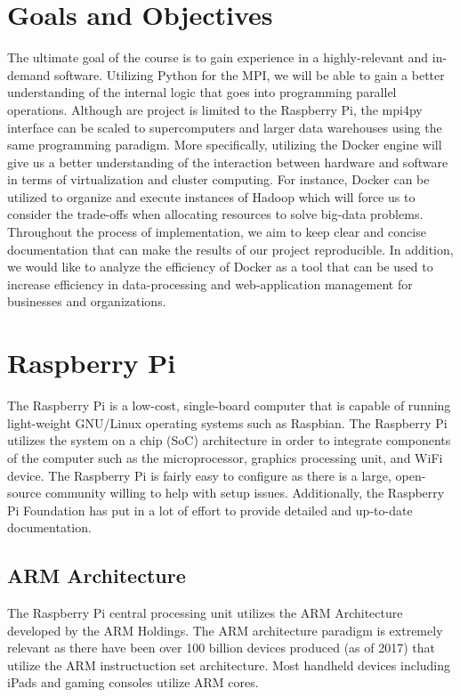 \section{Goals and Objectives}
The ultimate goal of the course is to gain experience in a highly-relevant and in-demand software. Utilizing Python for the MPI, we will be able to gain a better understanding of the internal logic that goes into programming parallel operations. Although are project is limited to the Raspberry Pi, the mpi4py interface can be scaled to supercomputers and larger data warehouses using the same programming paradigm. More specifically, utilizing the Docker engine will give us a better understanding of the interaction between hardware and software in terms of virtualization and cluster computing. For instance, Docker can be utilized to organize and execute instances of Hadoop which will force us to consider the trade-offs when allocating resources to solve big-data problems.  Throughout the process of implementation, we aim to keep clear and concise documentation that can make the results of our project reproducible. In addition, we would like to analyze the efficiency of Docker as a tool that can be used to increase efficiency in data-processing and web-application management for businesses and organizations. 

	


\section{Raspberry Pi }

	The Raspberry Pi is a low-cost, single-board computer that is capable of running light-weight GNU/Linux operating systems such as Raspbian. The Raspberry Pi utilizes the system on a chip (SoC) architecture in order to integrate components of the computer such as the microprocessor, graphics processing unit, and WiFi device. The Raspberry Pi is fairly easy to configure as there is a large, open-source community willing to help with setup issues. Additionally, the Raspberry Pi Foundation has put in a lot of effort to provide detailed and up-to-date documentation.

\subsection{ARM Architecture}

	The Raspberry Pi central processing unit utilizes the ARM Architecture developed by the ARM Holdings. The ARM architecture paradigm is extremely relevant as there have been over 100 billion devices produced (as of 2017) that utilize the ARM instructuction set architecture. Most handheld devices including iPads and gaming consoles utilize ARM cores.
	

